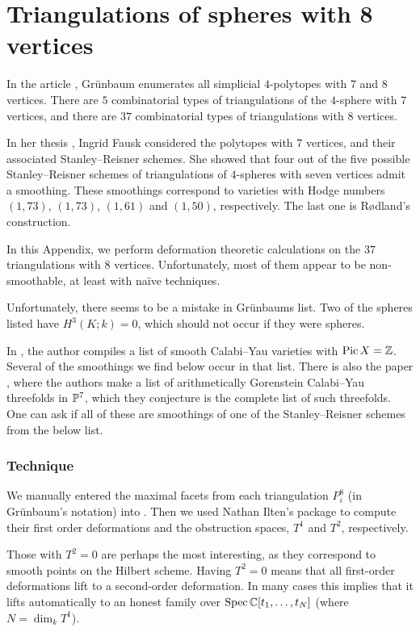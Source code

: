 \chapter{Triangulations of spheres with 8 vertices}
\label{sec:spheres8}

In the article \cite{grunbaum_enumeration}, Grünbaum enumerates all simplicial $4$-polytopes with $7$ and $8$ vertices. There are $5$ combinatorial types of triangulations of the $4$-sphere with $7$ vertices, and there are $37$ combinatorial types of triangulations with $8$ vertices.

In her thesis \cite{fausk_thesis}, Ingrid Fausk considered the polytopes with $7$ vertices, and their associated Stanley--Reisner schemes. She showed that four out of the five possible Stanley--Reisner schemes of triangulations of $4$-spheres with seven vertices admit a smoothing. These smoothings correspond to \CY varieties with Hodge numbers $(1,73)$, $(1,73)$, $(1,61)$ and $(1,50)$, respectively. The last one is Rødland's construction.

In this Appendix, we perform deformation theoretic calculations on the $37$ triangulations with $8$ vertices. Unfortunately, most of them appear to be non-smoothable, at least with naïve techniques.

Unfortunately, there seems to be a mistake in Grünbaums list. Two of the spheres listed have $H^3(K;k)=0$, which should not occur if they were spheres.

In \cite{kapustka_delpezzo}, the author compiles a list of smooth Calabi--Yau varieties with $\Pic X = \Z$. Several of the smoothings we find below occur in that list. There is also the paper \cite{MR3591944}, where the authors make a list of arithmetically Gorenstein Calabi--Yau threefolds in $\P^7$, which they conjecture is the complete list of such threefolds. One can ask if all of these are smoothings of one of the Stanley--Reisner schemes from the below list.

\subsection{Technique}

We manually entered the maximal facets from each triangulation $P_i^8$ (in Grünbaum's notation) into \MM. Then we used Nathan Ilten's package \cite{ilten_versaldeformations} to compute their first order deformations and the obstruction spaces, $T^1$ and $T^2$, respectively.

Those with $T^2=0$ are perhaps the most interesting, as they correspond to smooth points on the Hilbert scheme. Having $T^2=0$ means that all first-order deformations lift to a second-order deformation. In many cases this implies that it lifts automatically to an honest family over $\Spec \C[t_1,\ldots,t_N]$ (where $N=\dim_k T^1$).

